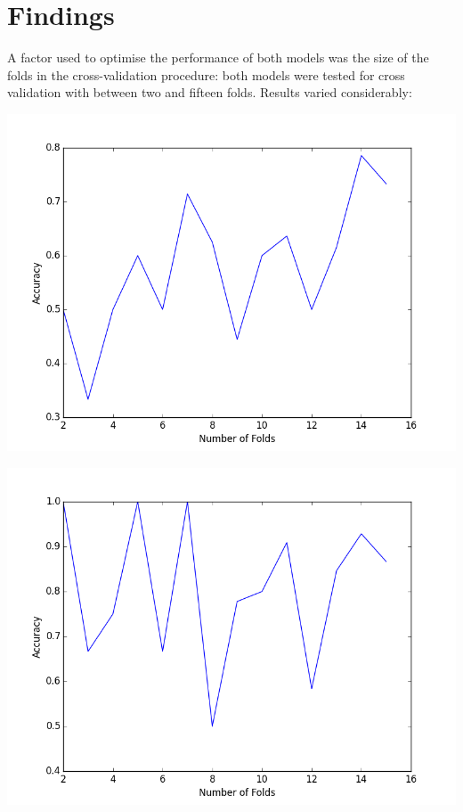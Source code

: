 \documentclass{tufte-handout}
\begin{document}
\section{Findings}
A factor used to optimise the performance of both models was the size of the folds in the cross-validation procedure: both models were tested for cross validation with between two and fifteen folds. Results varied considerably:\par

\includegraphics[width=\textwidth{},keepaspectratio]{cv_knn.png}

\includegraphics[width=\textwidth{},keepaspectratio]{cv_gnb.png}
\end{document}
